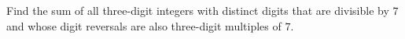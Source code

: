 Find the sum of all three-digit integers with distinct digits that are divisible by $7$ and whose digit reversals are also three-digit multiples of $7$.

